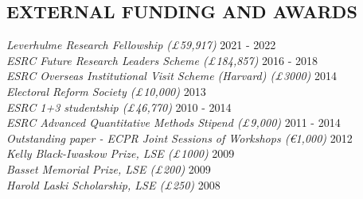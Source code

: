 \documentclass[centered]{res}
\begin{document}
\begin{resume}
\section{EXTERNAL FUNDING AND AWARDS}  {
{\sl Leverhulme Research Fellowship (\pounds 59,917)} \hfill 2021 - 2022 \\
{\sl ESRC Future Research Leaders Scheme (\pounds 184,857)} \hfill 2016 - 2018 \\
{\sl ESRC Overseas Institutional Visit Scheme (Harvard) (\pounds 3000)} \hfill 2014 \\
{\sl Electoral Reform Society (\pounds 10,000)} \hfill 2013 \\
{\sl ESRC 1+3 studentship (\pounds 46,770)} \hfill 2010 - 2014 \\
{\sl ESRC Advanced Quantitative Methods Stipend (\pounds 9,000)} \hfill 2011 - 2014 \\
{\sl Outstanding paper - ECPR Joint Sessions of Workshops (\euro 1,000)} \hfill 2012 \\
{\sl Kelly Black-Iwaskow Prize, LSE (\pounds 1000)} \hfill 2009 \\
{\sl Basset Memorial Prize, LSE (\pounds 200)} \hfill 2009 \\
\sl Harold Laski Scholarship, LSE (\pounds 250)} \hfill 2008 






\end{resume}
\end{document}
